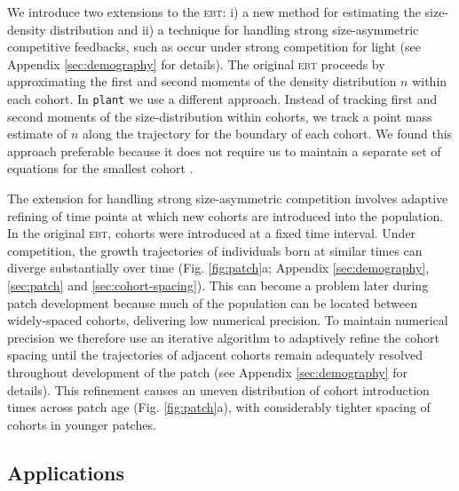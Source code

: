 \documentclass[a4paper,11pt]{article}
\newcommand{\plant}{\texttt{plant}}
\begin{document}
We introduce two extensions to the \textsc{ebt}: i) a new method for estimating
the size-density distribution and ii) a technique for handling strong
size-asymmetric competitive feedbacks, such as occur under strong
competition for light (see Appendix \ref{sec:demography} for
details). The original \textsc{ebt} \citep{Deroos-1988,
  Deroos-1992, Deroos-1997} proceeds by approximating the first and
second moments of the density distribution \(n\) within each
cohort. In {\plant} we use a different approach. Instead of tracking
first and second moments of the size-distribution within cohorts, we
track a point mass estimate of \(n\) along the trajectory for the
boundary of each cohort. We found this approach preferable because it
does not require us to maintain a separate set of equations for the
smallest cohort \citep{Deroos-1997}.

The extension for handling strong size-asymmetric competition involves
adaptive refining of time points at which new cohorts are introduced
into the population. In the original \textsc{ebt}, cohorts were introduced at a
fixed time interval. Under competition, the growth trajectories of
individuals born at similar times can diverge substantially over time
(Fig. \ref{fig:patch}a; Appendix \ref{sec:demography},
\ref{sec:patch} and \ref{sec:cohort-spacing}). This can become a
problem later during patch development because much of the population
can be located between widely-spaced cohorts, delivering low numerical
precision. To maintain numerical precision we therefore use an
iterative algorithm to adaptively refine the cohort spacing until the
trajectories of adjacent cohorts remain adequately resolved throughout
development of the patch (see Appendix \ref{sec:demography} for
details). This refinement causes an uneven distribution of cohort
introduction times across patch age (Fig.  \ref{fig:patch}a), with
considerably tighter spacing of cohorts in younger patches.

\subsection{Applications}
\end{document}
